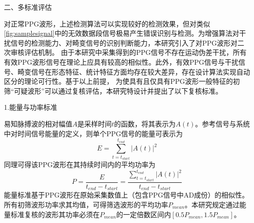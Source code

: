 
二、多标准评估

对正常PPG波形，上述检测算法可以实现较好的检测效果，但对类似\autoref{fig:samplesignal}中的无效数据段信号极易产生错误识别与检测。为增强算法对干扰信号的检测能力、对畸变信号的识别判断能力，本研究引入了对PPG波形对二次审核评估机制。
由于本研究中采集得到的PPG信号不存在运动伪差干扰，所有有效PPG波形信号在理论上应具有较高的相似性。此外，有效PPG信号与干扰信号、畸变信号在形态特征、统计特征方面均存在较大差异，存在设计算法实现自动区分的理论可行性。基于以上前提，
为使具有且仅具有PPG波形一般特征的初筛“可疑波形”可以通过复核评估，本研究特设计并提出了以下复核标准。

1.能量与功率标准

易知脉搏波的相对幅值$A$是采样时间$t$的函数，将其表示为$A(t)$。参考信号与系统中对时间信号能量的定义\cite{Alan2019}，则单个PPG信号的能量可表示为
\begin{equation}
    \label{equ:ppge}
    E=\sum_{t=t_{start}}^{t_{end}}|A(t)|^2
\end{equation}
同理可得该PPG波形在其持续时间内的平均功率为
\begin{equation}
    \label{equ:ppgp}
    P=\frac{E}{t_{end}-t_{start}}=\frac{\sum_{t=t_{start}}^{t_{end}}|A(t)|^2}{t_{end}-t_{start}}
\end{equation}
能量标准基于PPG波形在原始采集数值上（包含PPG信号中AD成份）的相似性。所有初筛波形功率求其均值，可得筛选波形的平均功率$P_{mean}$。本研究规定通过能量标准复核的波形其功率必须在$P_{mean}$的一定倍数区间内$[0.5P_{mean},1.5P_{mean}]$。


